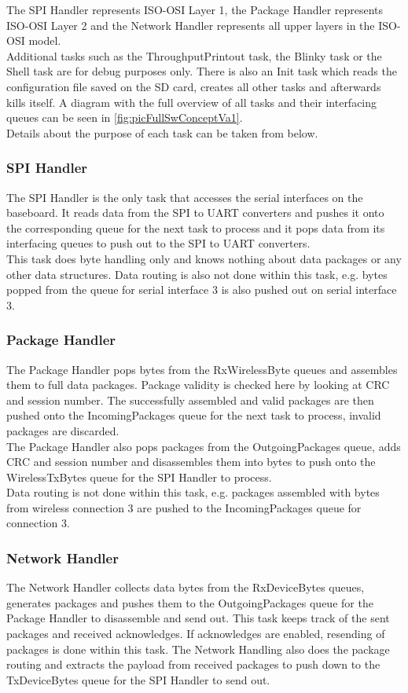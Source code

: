 The SPI Handler represents ISO-OSI Layer 1, the Package Handler represents ISO-OSI Layer 2 and the Network Handler represents all upper layers in the ISO-OSI model.\\
Additional tasks such as the ThroughputPrintout task, the Blinky task or the Shell task are for debug purposes only. There is also an Init task which reads the configuration file saved on the SD card, creates all other tasks and afterwards kills itself. A diagram with the full overview of all tasks and their interfacing queues can be seen in \autoref{fig:picFullSwConceptVa1}.\\
Details about the purpose of each task can be taken from below. 
%
\subsubsection{SPI Handler}
The SPI Handler is the only task that accesses the serial interfaces on the baseboard. It reads data from the SPI to UART converters and pushes it onto the corresponding queue for the next task to process and it pops data from its interfacing queues to push out to the SPI to UART converters.\\
This task does byte handling only and knows nothing about data packages or any other data structures. Data routing is also not done within this task, e.g. bytes popped from the queue for serial interface 3 is also pushed out on serial interface 3.
%
\subsubsection{Package Handler}
The Package Handler pops bytes from the RxWirelessByte queues and assembles them to full data packages. Package validity is checked here by looking at CRC and session number. The successfully assembled and valid packages are then pushed onto the IncomingPackages queue for the next task to process, invalid packages are discarded.\\
The Package Handler also pops packages from the OutgoingPackages queue, adds CRC and session number and disassembles them into bytes to push onto the WirelessTxBytes queue for the SPI Handler to process.\\
Data routing is not done within this task, e.g. packages assembled with bytes from wireless connection 3 are pushed to the IncomingPackages queue for connection 3.
%
\subsubsection{Network Handler}
The Network Handler collects data bytes from the RxDeviceBytes queues, generates packages and pushes them to the OutgoingPackages queue for the Package Handler to disassemble and send out. This task keeps track of the sent packages and received acknowledges. If acknowledges are enabled, resending of packages is done within this task. The Network Handling also does the package routing and extracts the payload from received packages to push down to the TxDeviceBytes queue for the SPI Handler to send out.
%
